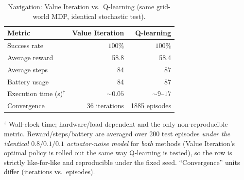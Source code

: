 \documentclass[11pt]{article}
\begin{document}
\begin{table}[H]
\centering
\caption{Navigation: Value Iteration vs.\ Q-learning (same grid-world MDP,
identical stochastic test).}
\begin{tabular}{lrr}
\toprule
Metric & Value Iteration & Q-learning \\
\midrule
Success rate       & $100\%$ & $100\%$ \\
Average reward     & 58.8    & 58.4 \\
Average steps      & 84      & 87 \\
Battery usage      & 84      & 87 \\
Execution time (s)$^{\dagger}$ & $\sim 0.05$ & $\sim 9\text{--}17$ \\
Convergence        & 36 iterations & 1885 episodes \\
\bottomrule
\end{tabular}

\vspace{2pt}
{\footnotesize $^{\dagger}$ Wall-clock time; hardware/load dependent and the
only non-reproducible metric. Reward/steps/battery are averaged over 200
test episodes \emph{under the identical $0.8/0.1/0.1$ actuator-noise model}
for \emph{both} methods (Value Iteration's optimal policy is rolled out the
same way Q-learning is tested), so the row is strictly like-for-like and
reproducible under the fixed seed. ``Convergence'' units differ (iterations
vs.\ episodes).}
\end{table}
\end{document}
